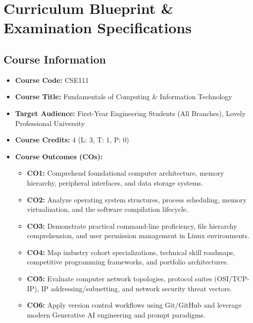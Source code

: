 \chapter*{Curriculum Blueprint \& Examination Specifications}

\section*{Course Information}
\begin{itemize}[leftmargin=8mm]
    \item \textbf{Course Code:} CSE111
    \item \textbf{Course Title:} Fundamentals of Computing \& Information Technology
    \item \textbf{Target Audience:} First-Year Engineering Students (All Branches), Lovely Professional University
    \item \textbf{Course Credits:} 4 (L: 3, T: 1, P: 0)
    \item \textbf{Course Outcomes (COs):}
    \begin{itemize}
        \item \textbf{CO1:} Comprehend foundational computer architecture, memory hierarchy, peripheral interfaces, and data storage systems.
        \item \textbf{CO2:} Analyze operating system structures, process scheduling, memory virtualization, and the software compilation lifecycle.
        \item \textbf{CO3:} Demonstrate practical command-line proficiency, file hierarchy comprehension, and user permission management in Linux environments.
        \item \textbf{CO4:} Map industry cohort specializations, technical skill roadmaps, competitive programming frameworks, and portfolio architectures.
        \item \textbf{CO5:} Evaluate computer network topologies, protocol suites (OSI/TCP-IP), IP addressing/subnetting, and network security threat vectors.
        \item \textbf{CO6:} Apply version control workflows using Git/GitHub and leverage modern Generative AI engineering and prompt paradigms.
    \end{itemize}
\end{itemize}

\vspace{3mm}

